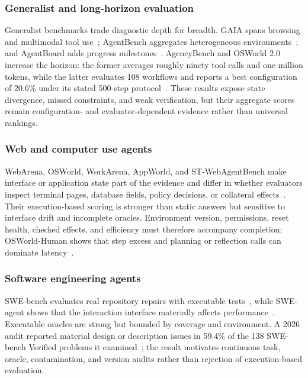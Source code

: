 \subsubsection{Generalist and long-horizon evaluation}

Generalist benchmarks trade diagnostic depth for breadth. GAIA spans browsing and multimodal tool use~\cite{mialon2024gaia}; AgentBench aggregates heterogeneous environments~\cite{liu2024agentbench}; and AgentBoard adds progress milestones~\cite{hsieh2024agentboard}. AgencyBench and OSWorld 2.0 increase the horizon: the former averages roughly ninety tool calls and one million tokens, while the latter evaluates 108 workflows and reports a best configuration of 20.6\% under its stated 500-step protocol~\cite{li2026agencybench,yuan2026osworld2}. These results expose state divergence, missed constraints, and weak verification, but their aggregate scores remain configuration- and evaluator-dependent evidence rather than universal rankings.

\subsubsection{Web and computer use agents}

WebArena, OSWorld, WorkArena, AppWorld, and ST-WebAgentBench make interface or application state part of the evidence and differ in whether evaluators inspect terminal pages, database fields, policy decisions, or collateral effects~\cite{zhou2024webarena,xie2024osworld,drouin2024workarena,trivedi2024appworld,levy2026stwebagentbench}. Their execution-based scoring is stronger than static answers but sensitive to interface drift and incomplete oracles. Environment version, permissions, reset health, checked effects, and efficiency must therefore accompany completion; OSWorld-Human shows that step excess and planning or reflection calls can dominate latency~\cite{abhyankar2025osworldhuman}.

\subsubsection{Software engineering agents}

SWE-bench evaluates real repository repairs with executable tests~\cite{jimenez2024swebench}, while SWE-agent shows that the interaction interface materially affects performance~\cite{yang2024sweagent}. Executable oracles are strong but bounded by coverage and environment. A 2026 audit reported material design or description issues in 59.4\% of the 138 SWE-bench Verified problems it examined~\cite{openai2026swebenchaudit}; the result motivates continuous task, oracle, contamination, and version audits rather than rejection of execution-based evaluation.

